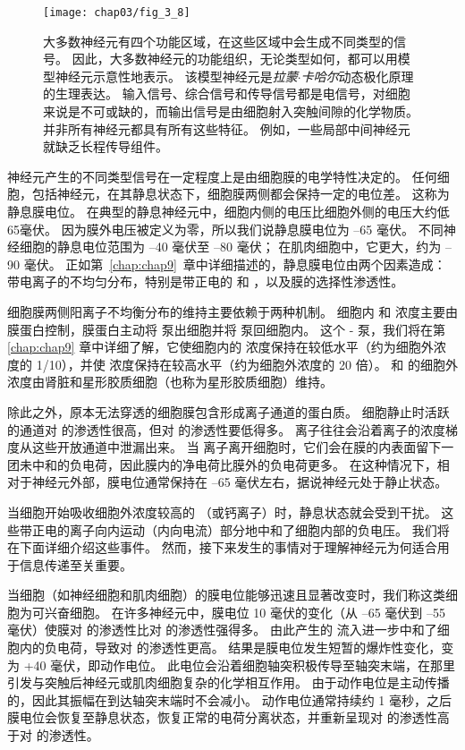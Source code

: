 \begin{figure}[htbp]
	\centering
	\texttt{[image: chap03/fig\_3\_8]}
	\caption{大多数神经元有四个功能区域，在这些区域中会生成不同类型的信号。 
		因此，大多数神经元的功能组织，无论类型如何，都可以用模型神经元示意性地表示。 
		该模型神经元是\textit{拉蒙$\cdot$卡哈尔}动态极化原理的生理表达。 
		输入信号、综合信号和传导信号都是电信号，对细胞来说是不可或缺的，而输出信号是由细胞射入突触间隙的化学物质。 
		并非所有神经元都具有所有这些特征。 
		例如，一些局部中间神经元就缺乏长程传导组件。}
	\label{fig:3_8}
\end{figure}


神经元产生的不同类型信号在一定程度上是由细胞膜的电学特性决定的。
任何细胞，包括神经元，在其静息状态下，细胞膜两侧都会保持一定的电位差。 
这称为静息膜电位。 
在典型的静息神经元中，细胞内侧的电压比细胞外侧的电压大约低65毫伏。
因为膜外电压被定义为零，所以我们说静息膜电位为 –65 毫伏。 
不同神经细胞的静息电位范围为 –40 毫伏至 –80 毫伏； 
在肌肉细胞中，它更大，约为 –90 毫伏。 
正如第~\ref{chap:chap9}~章中详细描述的，静息膜电位由两个因素造成：
带电离子的不均匀分布，特别是带正电的  和 ，以及膜的选择性渗透性。


细胞膜两侧阳离子不均衡分布的维持主要依赖于两种机制。
细胞内  和  浓度主要由膜蛋白控制，膜蛋白主动将  泵出细胞并将  泵回细胞内。 
这个 - 泵，我们将在第 \ref{chap:chap9} 章中详细了解，它使细胞内的  浓度保持在较低水平（约为细胞外浓度的 1/10），并使  浓度保持在较高水平（约为细胞外浓度的 20 倍）。
 和  的细胞外浓度由肾脏和星形胶质细胞（也称为星形胶质细胞）维持。


除此之外，原本无法穿透的细胞膜包含形成离子通道的蛋白质。 细胞静止时活跃的通道对  的渗透性很高，但对  的渗透性要低得多。 
 离子往往会沿着离子的浓度梯度从这些开放通道中泄漏出来。 
当  离子离开细胞时，它们会在膜的内表面留下一团未中和的负电荷，因此膜内的净电荷比膜外的负电荷更多。 
在这种情况下，相对于神经元外部，膜电位通常保持在 –65 毫伏左右，据说神经元处于静止状态。


当细胞开始吸收细胞外浓度较高的 （或钙离子）时，静息状态就会受到干扰。 
这些带正电的离子向内运动（内向电流）部分地中和了细胞内部的负电压。 
我们将在下面详细介绍这些事件。 
然而，接下来发生的事情对于理解神经元为何适合用于信息传递至关重要。


当细胞（如神经细胞和肌肉细胞）的膜电位能够迅速且显著改变时，我们称这类细胞为可兴奋细胞。 
在许多神经元中，膜电位 10 毫伏的变化（从 –65 毫伏到 –55 毫伏）使膜对  的渗透性比对  的渗透性强得多。 
由此产生的  流入进一步中和了细胞内的负电荷，导致对  的渗透性更高。 
结果是膜电位发生短暂的爆炸性变化，变为 +40 毫伏，即动作电位。 
此电位会沿着细胞轴突积极传导至轴突末端，在那里引发与突触后神经元或肌肉细胞复杂的化学相互作用。 
由于动作电位是主动传播的，因此其振幅在到达轴突末端时不会减小。 
动作电位通常持续约 1 毫秒，之后膜电位会恢复至静息状态，恢复正常的电荷分离状态，并重新呈现对  的渗透性高于对  的渗透性。


